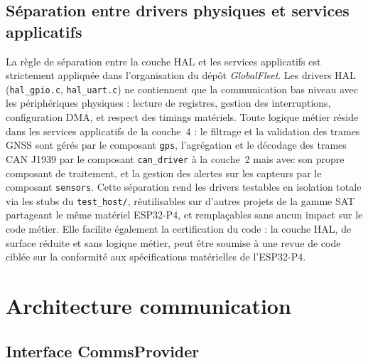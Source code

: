 \subsection{Séparation entre drivers physiques et services applicatifs}
\label{subsec:hal_sep}

La règle de séparation entre la couche HAL et les services applicatifs
est strictement appliquée dans l'organisation du dépôt
\textit{GlobalFleet}. Les drivers HAL (\texttt{hal\_gpio.c},
\texttt{hal\_uart.c}) ne contiennent que la communication bas niveau
avec les périphériques physiques : lecture de registres, gestion des
interruptions, configuration DMA, et respect des timings matériels.
Toute logique métier réside dans les services applicatifs de la
couche~4 : le filtrage et la validation des trames GNSS sont gérés
par le composant \texttt{gps}, l'agrégation et le décodage des trames
CAN J1939 par le composant \texttt{can\_driver} à la couche~2 mais
avec son propre composant de traitement, et la gestion des alertes
sur les capteurs par le composant \texttt{sensors}. Cette séparation
rend les drivers testables en isolation totale via les stubs du
\texttt{test\_host/}, réutilisables sur d'autres projets de la
gamme SAT partageant le même matériel ESP32-P4, et remplaçables
sans aucun impact sur le code métier. Elle facilite également la
certification du code : la couche HAL, de surface réduite et sans
logique métier, peut être soumise à une revue de code ciblée sur
la conformité aux spécifications matérielles de l'ESP32-P4.

\section{Architecture communication}
\label{sec:comms}

\subsection{Interface CommsProvider}
\label{subsec:comms_iface}

